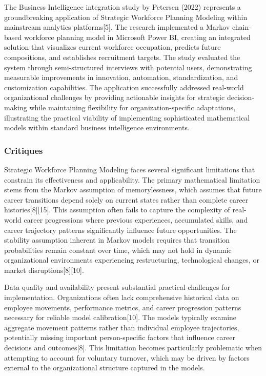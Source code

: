 \documentclass[main.tex]{subfiles}
\begin{document}
The Business Intelligence integration study by Petersen (2022) represents a groundbreaking application of Strategic Workforce Planning Modeling within mainstream analytics platforms[5]. The research implemented a Markov chain-based workforce planning model in Microsoft Power BI, creating an integrated solution that visualizes current workforce occupation, predicts future compositions, and establishes recruitment targets. The study evaluated the system through semi-structured interviews with potential users, demonstrating measurable improvements in innovation, automation, standardization, and customization capabilities. The application successfully addressed real-world organizational challenges by providing actionable insights for strategic decision-making while maintaining flexibility for organization-specific adaptations, illustrating the practical viability of implementing sophisticated mathematical models within standard business intelligence environments.

\subsubsection{Critiques}

Strategic Workforce Planning Modeling faces several significant limitations that constrain its effectiveness and applicability. The primary mathematical limitation stems from the Markov assumption of memorylessness, which assumes that future career transitions depend solely on current states rather than complete career histories[8][15]. This assumption often fails to capture the complexity of real-world career progressions where previous experiences, accumulated skills, and career trajectory patterns significantly influence future opportunities. The stability assumption inherent in Markov models requires that transition probabilities remain constant over time, which may not hold in dynamic organizational environments experiencing restructuring, technological changes, or market disruptions[8][10].

Data quality and availability present substantial practical challenges for implementation. Organizations often lack comprehensive historical data on employee movements, performance metrics, and career progression patterns necessary for reliable model calibration[10]. The models typically examine aggregate movement patterns rather than individual employee trajectories, potentially missing important person-specific factors that influence career decisions and outcomes[8]. This limitation becomes particularly problematic when attempting to account for voluntary turnover, which may be driven by factors external to the organizational structure captured in the models.
\end{document}
